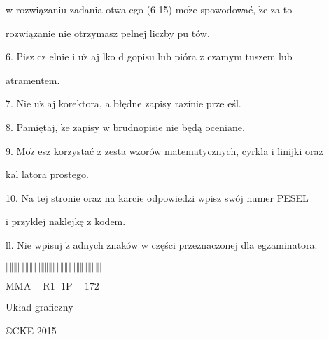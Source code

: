 \documentclass[a4paper,12pt]{article}
\begin{document}
w rozwiązaniu zadania otwa ego (6-15) $\mathrm{m}\mathrm{o}\dot{\mathrm{z}}\mathrm{e}$ spowodować, $\dot{\mathrm{z}}\mathrm{e}$ za to

rozwiązanie nie otrzymasz pelnej liczby pu tów.

6. Pisz cz elnie i $\mathrm{u}\dot{\mathrm{z}}$ aj lko $\mathrm{d}$ gopisu lub pióra z czamym tuszem lub

atramentem.

7. Nie $\mathrm{u}\dot{\mathrm{z}}$ aj korektora, a błędne zapisy razínie prze eśl.

8. Pamiętaj, $\dot{\mathrm{z}}\mathrm{e}$ zapisy w brudnopisie nie będą oceniane.

9. $\mathrm{M}\mathrm{o}\dot{\mathrm{z}}$ esz korzystać z zesta wzorów matematycznych, cyrkla i linijki oraz

kal latora prostego.

10. Na tej stronie oraz na karcie odpowiedzi wpisz swój numer PESEL

i przyklej naklejkę z kodem.

ll. Nie wpisuj $\dot{\mathrm{z}}$ adnych znaków w części przeznaczonej dla egzaminatora.

$\Vert\Vert\Vert\Vert\Vert\Vert\Vert\Vert\Vert\Vert\Vert\Vert\Vert\Vert\Vert\Vert\Vert\Vert\Vert\Vert\Vert\Vert\Vert\Vert|$

$\mathrm{M}\mathrm{M}\mathrm{A}-\mathrm{R}1_{-}1\mathrm{P}-172$

Układ graficzny

\copyright CKE 2015
\end{document}
